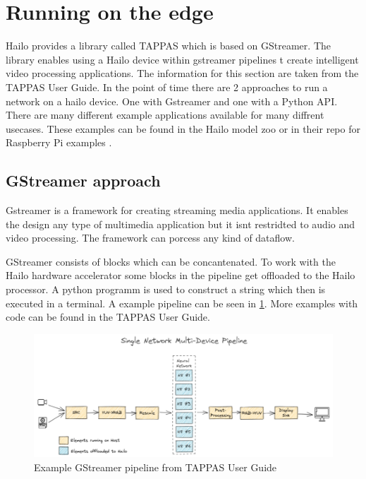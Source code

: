 \section{Running on the edge}

Hailo provides a library called TAPPAS which is based on GStreamer.
The library enables using a Hailo device within gstreamer pipelines t create intelligent video processing applications.
The information for this section are taken from the TAPPAS User Guide.
In the point of time there are 2 approaches to run a network on a hailo device.
One with Gstreamer and one with a Python API.
There are many different example applications available for many diffrent usecases.
These examples can be found in the Hailo model zoo\cite{hailo_model_zoo} or in their repo for Raspberry Pi examples \cite{hailo_rpi5_examples}.


\subsection{GStreamer approach}

Gstreamer is a framework for creating streaming media applications.
It enables the design any type of multimedia application but it isnt restridted to audio and video processing.
The framework can porcess any kind of dataflow.

GStreamer consists of blocks which can be concantenated.
To work with the Hailo hardware accelerator some blocks in the pipeline get offloaded to the Hailo processor.
A python programm is used to construct a string which then is executed in a terminal.
A example pipeline can be seen in \cref{fig:hardware:gstreamerpipeline}.
More examples with code can be found in the TAPPAS User Guide.
\begin{figure}[!h]
    \centering
    \includegraphics[width=\textwidth]{Images/Hardware/gstreamerExample.png}
    \caption{Example GStreamer pipeline from TAPPAS User Guide}
    \label{fig:hardware:gstreamerpipeline}
\end{figure}

